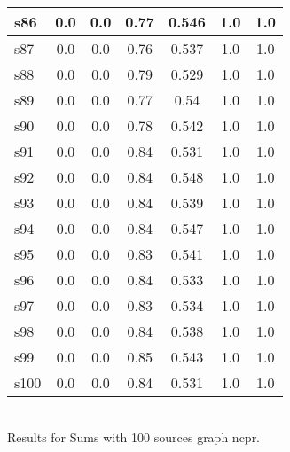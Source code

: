 \documentclass{article}
\begin{document}
\begin{tabular}{|l|c|c|c|c|c|c|}
\hline
s86 &0.0 & 0.0 & 0.77 & 0.546 & 1.0 & 1.0\\
\hline
s87 &0.0 & 0.0 & 0.76 & 0.537 & 1.0 & 1.0\\
\hline
s88 &0.0 & 0.0 & 0.79 & 0.529 & 1.0 & 1.0\\
\hline
s89 &0.0 & 0.0 & 0.77 & 0.54 & 1.0 & 1.0\\
\hline
s90 &0.0 & 0.0 & 0.78 & 0.542 & 1.0 & 1.0\\
\hline
s91 &0.0 & 0.0 & 0.84 & 0.531 & 1.0 & 1.0\\
\hline
s92 &0.0 & 0.0 & 0.84 & 0.548 & 1.0 & 1.0\\
\hline
s93 &0.0 & 0.0 & 0.84 & 0.539 & 1.0 & 1.0\\
\hline
s94 &0.0 & 0.0 & 0.84 & 0.547 & 1.0 & 1.0\\
\hline
s95 &0.0 & 0.0 & 0.83 & 0.541 & 1.0 & 1.0\\
\hline
s96 &0.0 & 0.0 & 0.84 & 0.533 & 1.0 & 1.0\\
\hline
s97 &0.0 & 0.0 & 0.83 & 0.534 & 1.0 & 1.0\\
\hline
s98 &0.0 & 0.0 & 0.84 & 0.538 & 1.0 & 1.0\\
\hline
s99 &0.0 & 0.0 & 0.85 & 0.543 & 1.0 & 1.0\\
\hline
s100 &0.0 & 0.0 & 0.84 & 0.531 & 1.0 & 1.0\\
\hline
\end{tabular}\\

\noindent Results for Sums with 100 sources graph ncpr.
\end{document}
